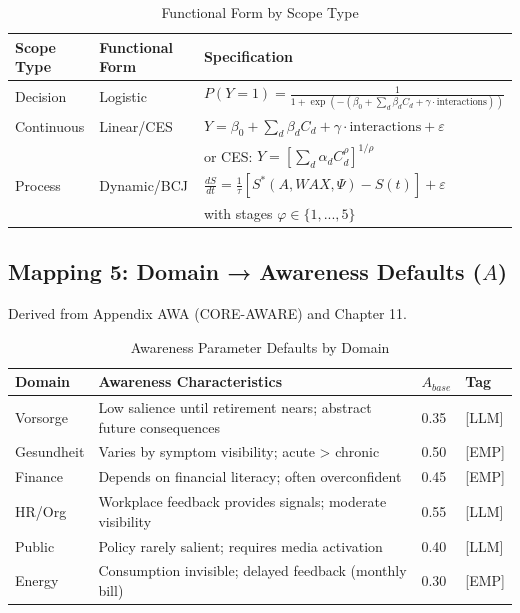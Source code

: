 \begin{table}[htbp]
\centering
\caption{Functional Form by Scope Type}
\label{tab:ggg-form-mapping}
\renewcommand{\arraystretch}{1.4}
\begin{tabular}{@{}llp{5cm}@{}}
\toprule
\textbf{Scope Type} & \textbf{Functional Form} & \textbf{Specification} \\
\midrule
Decision & Logistic & $P(Y=1) = \frac{1}{1+\exp(-(\beta_0 + \sum_d \beta_d C_d + \gamma \cdot \text{interactions}))}$ \\
\addlinespace
Continuous & Linear/CES & $Y = \beta_0 + \sum_d \beta_d C_d + \gamma \cdot \text{interactions} + \varepsilon$ \\
& & or CES: $Y = [\sum_d \alpha_d C_d^\rho]^{1/\rho}$ \\
\addlinespace
Process & Dynamic/BCJ & $\frac{dS}{dt} = \frac{1}{\tau}[S^*(A, WAX, \Psi) - S(t)] + \varepsilon$ \\
& & with stages $\varphi \in \{1,...,5\}$ \\
\bottomrule
\end{tabular}
\end{table}


\subsection{Mapping 5: Domain → Awareness Defaults ($A$)}

Derived from Appendix AWA (CORE-AWARE) and Chapter 11.

\begin{table}[htbp]
\centering
\caption{Awareness Parameter Defaults by Domain}
\label{tab:ggg-awareness-mapping}
\renewcommand{\arraystretch}{1.3}
\begin{tabular}{@{}lp{4cm}ll@{}}
\toprule
\textbf{Domain} & \textbf{Awareness Characteristics} & \textbf{$A_{base}$} & \textbf{Tag} \\
\midrule
Vorsorge & Low salience until retirement nears; abstract future consequences & 0.35 & [LLM] \\
Gesundheit & Varies by symptom visibility; acute > chronic & 0.50 & [EMP] \\
Finance & Depends on financial literacy; often overconfident & 0.45 & [EMP] \\
HR/Org & Workplace feedback provides signals; moderate visibility & 0.55 & [LLM] \\
Public & Policy rarely salient; requires media activation & 0.40 & [LLM] \\
Energy & Consumption invisible; delayed feedback (monthly bill) & 0.30 & [EMP] \\
\bottomrule
\end{tabular}
\end{table}

